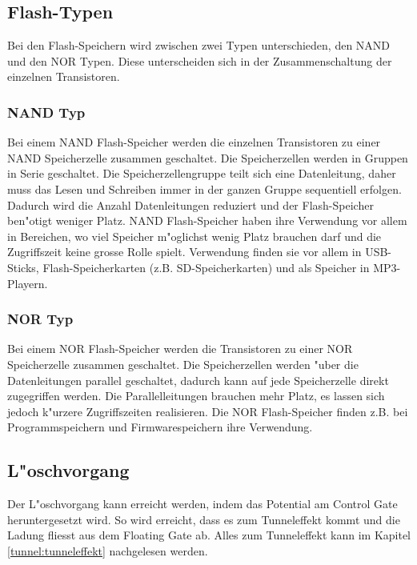 \begin{refsection}
\subsection{Flash-Typen}
Bei den Flash-Speichern wird zwischen zwei Typen unterschieden, den NAND
und den NOR Typen.
Diese unterscheiden sich in der Zusammenschaltung der einzelnen Transistoren.

\subsubsection{NAND Typ}
Bei einem NAND Flash-Speicher werden die einzelnen Transistoren zu einer
NAND Speicherzelle zusammen geschaltet.
Die Speicherzellen werden in Gruppen in Serie geschaltet.
Die Speicherzellengruppe teilt sich eine Datenleitung, daher muss das
Lesen und Schreiben immer in der ganzen Gruppe sequentiell erfolgen.
Dadurch wird die Anzahl Datenleitungen reduziert und der Flash-Speicher
ben"otigt weniger Platz.
NAND Flash-Speicher haben ihre Verwendung vor allem in Bereichen, wo viel
Speicher m"oglichst wenig Platz brauchen darf und die Zugriffszeit keine
grosse Rolle spielt.
Verwendung finden sie vor allem in USB-Sticks, Flash-Speicherkarten
(z.B. SD-Speicherkarten) und als Speicher in MP3-Playern.

\subsubsection{NOR Typ}
%
Bei einem NOR Flash-Speicher werden die Transistoren zu einer NOR
Speicherzelle zusammen geschaltet.
Die Speicherzellen werden "uber die Datenleitungen parallel geschaltet,
dadurch kann auf jede Speicherzelle direkt zugegriffen werden.
Die Parallelleitungen brauchen mehr Platz, es lassen sich jedoch k"urzere
Zugriffszeiten realisieren.
Die NOR Flash-Speicher finden z.B. bei Programmspeichern und Firmwarespeichern
ihre Verwendung.

\subsection{L"oschvorgang}
%
Der L"oschvorgang kann erreicht werden, indem das Potential am 
Control Gate heruntergesetzt wird.
So wird erreicht, dass es zum Tunneleffekt kommt und die Ladung fliesst
aus dem Floating Gate ab.
Alles zum Tunneleffekt kann im Kapitel \ref{tunnel:tunneleffekt} nachgelesen werden.


\end{refsection}
